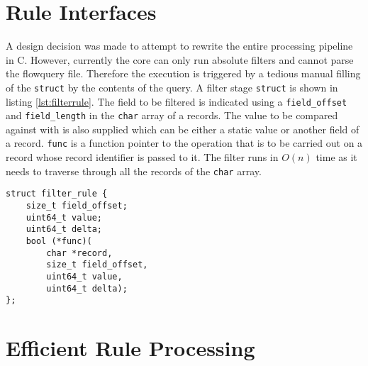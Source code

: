


\section{Rule Interfaces}\label{sec:rule-interfaces}


A design decision was made to attempt to rewrite the entire processing
pipeline in C.  However, currently the core can only run absolute filters and
cannot parse the flowquery file. Therefore the execution is triggered by a
tedious manual filling of the \texttt{struct} by the contents of the query.  A
filter  stage \texttt{struct} is shown in
listing \ref{lst:filterrule}. The field to be filtered is indicated using a
\texttt{field\_offset} and \texttt{field\_length} in the \texttt{char} array
of a records. The value to be compared against with is also supplied which can
be either a static value or another field of a record.  \texttt{func} is a
function pointer to the operation that is to be carried out on a record whose
record identifier is passed to it. The filter runs in $O(n)$ time as it needs
to traverse through all the records of the \texttt{char} array.

\begin{lstlisting}
struct filter_rule {
	size_t field_offset;
	uint64_t value;
	uint64_t delta;
	bool (*func)(
		char *record,
		size_t field_offset,
		uint64_t value,
		uint64_t delta);
};
\end{lstlisting}


\section{Efficient Rule Processing}\label{sec:efficient-rule-processing}

